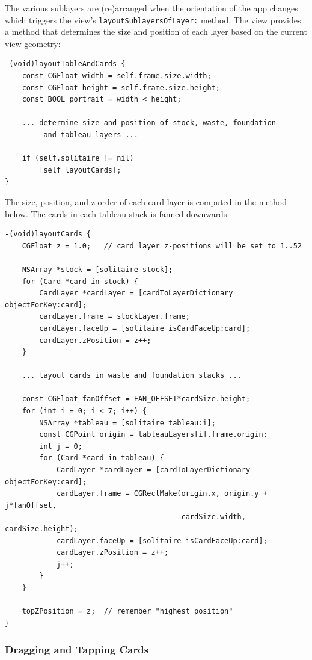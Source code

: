 \documentclass[11pt]{article}
\begin{document}
The various sublayers are (re)arranged when the orientation
of the app changes which triggers the 
view's {\tt layoutSublayersOfLayer:} method.
The view provides a method that determines the size and position
of each layer based on the current view geometry:
\begin{verbatim}
-(void)layoutTableAndCards {
    const CGFloat width = self.frame.size.width;
    const CGFloat height = self.frame.size.height;
    const BOOL portrait = width < height;
    
    ... determine size and position of stock, waste, foundation
         and tableau layers ...
    
    if (self.solitaire != nil)
        [self layoutCards];
}
\end{verbatim}
The size, position, and z-order of each card layer is computed
in the method below. The cards in each tableau stack is fanned downwards.
\begin{verbatim}
-(void)layoutCards {
    CGFloat z = 1.0;   // card layer z-positions will be set to 1..52

    NSArray *stock = [solitaire stock];
    for (Card *card in stock) {
        CardLayer *cardLayer = [cardToLayerDictionary objectForKey:card];
        cardLayer.frame = stockLayer.frame;
        cardLayer.faceUp = [solitaire isCardFaceUp:card];
        cardLayer.zPosition = z++;
    }

    ... layout cards in waste and foundation stacks ...
    
    const CGFloat fanOffset = FAN_OFFSET*cardSize.height;
    for (int i = 0; i < 7; i++) {
        NSArray *tableau = [solitaire tableau:i];
        const CGPoint origin = tableauLayers[i].frame.origin;
        int j = 0;
        for (Card *card in tableau) {
            CardLayer *cardLayer = [cardToLayerDictionary objectForKey:card];
            cardLayer.frame = CGRectMake(origin.x, origin.y + j*fanOffset,
                                         cardSize.width, cardSize.height);
            cardLayer.faceUp = [solitaire isCardFaceUp:card];
            cardLayer.zPosition = z++;
            j++;
        }
    }
    
    topZPosition = z;  // remember "highest position"
}
\end{verbatim}


\subsubsection{Dragging and Tapping Cards}
\end{document}
